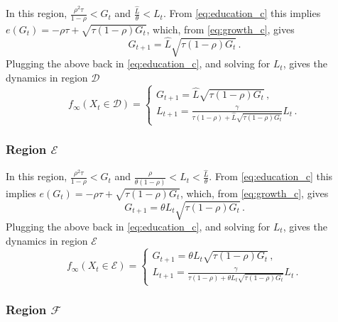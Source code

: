 \documentclass[a4paper,fleqn]{cas-sc}
\begin{document}
In this region, $\frac{\rho^2\tau}{1-\rho} < G_t$ and $\frac{\hat L}{\theta}<L_t$. 
From \eqref{eq:education_c} this implies $e(G_t) = - \rho\tau + \sqrt{\tau(1-\rho)G_t}$, which, from \eqref{eq:growth_c}, gives
%
\begin{equation*}
    G_{t+1} = \hat L\sqrt{\tau(1-\rho) G_t}\,.
\end{equation*}
%
Plugging the above back in \eqref{eq:education_c}, and solving for $L_t$, gives the dynamics in region $\mathcal D$
%
\begin{equation}\label{eq:dynamics_in_D}
    f_{\infty}(X_t\in\mathcal D) = \begin{cases}
                            G_{t+1} = \hat L\sqrt{\tau(1-\rho)G_t} \,, \\[8pt]
                            L_{t+1} = \frac{\gamma}{\tau(1-\rho) + \hat L\sqrt{\tau(1-\rho)G_t}} L_t\,.
                      \end{cases}
\end{equation}

\subsubsection{Region $\mathcal{E}$}\label{appenix_C_5}

In this region, $\frac{\rho^2\tau}{1-\rho} < G_t$ and $\frac{\rho}{\theta(1-\rho)}<L_t<\frac{\hat L}{\theta}$. 
From \eqref{eq:education_c} this implies $e(G_t) = - \rho\tau + \sqrt{\tau(1-\rho)G_t}$, which, from \eqref{eq:growth_c}, gives
%
\begin{equation*}
    G_{t+1} = \theta L_t\sqrt{\tau(1-\rho) G_t}\,.
\end{equation*}
%
Plugging the above back in \eqref{eq:education_c}, and solving for $L_t$, gives the dynamics in region $\mathcal E$
%
\begin{equation}\label{eq:dynamics_in_E}
    f_{\infty}(X_t\in\mathcal E) = \begin{cases}
                            G_{t+1} = \theta L_t\sqrt{\tau(1-\rho)G_t} \,, \\[8pt]
                            L_{t+1} = \frac{\gamma}{\tau(1-\rho) + \theta L_t\sqrt{\tau(1-\rho)G_t}} L_t\,.
                      \end{cases}
\end{equation}

\subsubsection{Region $\mathcal{F}$}\label{appenix_C_6}
\end{document}
